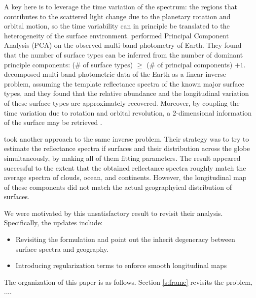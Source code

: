 \documentclass[iop,numberedappendix,apj,]{emulateapj}
\begin{document}
A key here is to leverage the time variation of the spectrum: the regions that contributes to the scattered light change due to the planetary rotation and  orbital motion, so the time variability can in principle be translated to the heterogeneity of the surface environment.  
\citet{Cowan2009, Cowan2011} performed Principal Component Analysis (PCA) on the observed multi-band photometry of Earth. They found that the number of surface types can be inferred from the number of dominant principle components: (\# of surface types) $\ge $ (\# of principal components) $+ 1$. %
\citet{Fujii2010, Fujii2011} decomposed multi-band photometric data of the Earth as a linear inverse problem, assuming the template reflectance spectra of the known major surface types, and they found that the relative abundance and the longitudinal variation of these surface types are approximately recovered. 
Moreover, by coupling the time variation due to rotation and orbital revolution, a 2-dimensional information of the surface may be retrieved \citep{Kawahara2010, Kawahara2011, Fujii2012}. 

\citet{Cowan2013} took another approach to the same inverse problem. 
Their strategy was to try to estimate the reflectance spectra if surfaces and their distribution across the globe simultaneously, by making all of them fitting parameters. 
The result appeared successful to the extent that the obtained reflectance spectra roughly match the average spectra of clouds, ocean, and continents. 
However, the longitudinal map of these components did not match the actual geographyical distribution of surfaces. 

We were motivated by this unsatisfactory result to revisit their analysis. 
Specifically, the updates include:
\begin{itemize}
\item Revisiting the formulation and point out the inherit degeneracy between surface spectra and geography. 
\item Introducing regularization terms to enforce smooth longitudinal maps 
\end{itemize}

The organization of this paper is as follows. 
Section \ref{s:frame} revisits the problem, ....

\end{document}
